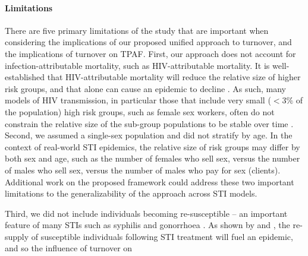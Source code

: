 \paragraph{Limitations}
There are five primary limitations of the study that are important when considering
the implications of our proposed unified approach to turnover,
and the implications of turnover on TPAF.
First, our approach does not account for
infection-attributable mortality, such as HIV-attributable mortality.
It is well-established that HIV-attributable mortality will reduce the 
relative size of higher risk groups,
and that alone can cause an epidemic to decline \citep{Boily1997}.
As such, many models of HIV transmission,
in particular those that include very small ($<3\%$ of the population)
high risk groups, such as female sex workers,
often do not constrain the relative size
of the sub-group populations to be stable over time
\citep{Pickles2013}.
Second, we assumed a single-sex population and did not stratify by age.
In the context of real-world STI epidemics,
the relative size of risk groups may differ
by both sex and age,
such as the number of females who sell sex,
versus the number of males who sell sex,
versus the number of males who pay for sex (clients).
Additional work on the proposed framework could address
these two important limitations to the generalizability of the approach across STI models.
\par
Third, we did not include individuals becoming re-susceptible
-- an important feature of many STIs such as syphilis and gonorrhoea
\citep{Fenton2008}.
As shown by \citet{Fenton2008} and \citet{Pourbohloul2003},
the re-supply of susceptible individuals following STI treatment
will fuel an epidemic, and so the influence of turnover on
